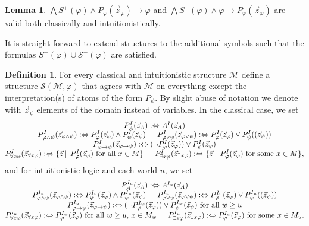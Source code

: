 \documentclass[a4paper,11pt]{report}
\theoremstyle{definition}
\theoremstyle{definition}
\theoremstyle{definition}
\newtheorem{lemma}[theorem]{Lemma}
\theoremstyle{definition}
\theoremstyle{definition}
\newtheorem{definition}[theorem]{Definition}
\theoremstyle{definition}
\theoremstyle{definition}
\begin{document}
	\begin{lemma}
		$\bigwedge S^+(\varphi)\wedge P_\varphi(\vec z_\varphi)\to\varphi$ and $\bigwedge S^-(\varphi)\wedge \varphi\to P_\varphi(\vec z_\varphi)$ are valid both classically and intuitionistically.
	\end{lemma}
	
	It is straight-forward to extend structures to the additional symbols such that the formulas $S^+(\varphi)\cup\mathcal S^-(\varphi)$ are satisfied.
	\begin{definition}
		For every classical and intuitionistic structure $\mathcal M$ define a structure $\mathcal S(\mathcal M,\varphi)$ that agrees with $\mathcal M$ on everything except the interpretation(s) of atoms of the form $P_\psi$. By slight abuse of notation we denote with $\vec z_\psi$ elements of the domain instead of variables. In the classical case, we set
		$$\begin{matrix}
			P_A^I(\vec z_A):\Leftrightarrow A^I(\vec z_A)\\
			P_{\varphi\wedge\psi}^I(\vec z_{\varphi\wedge\psi}) :\Leftrightarrow P_{\varphi}^I(\vec z_\varphi)\wedge P_{\psi}^I(\vec z_\psi)\indent P_{\varphi\vee\psi}^I(\vec z_{\varphi\vee\psi}) :\Leftrightarrow P_{\varphi}^I(\vec z_\varphi)\vee P_{\psi}^I((\vec z_\psi))\\P_{\varphi\to\psi}^I(\vec z_{\varphi\to\psi}) :\Leftrightarrow (\neg P_{\varphi}^I(\vec z_{\varphi}))\vee P_{\psi}^I(\vec z_{\psi})\\P_{\forall x\varphi}^I(\vec z_{\forall x\varphi}) :\Leftrightarrow \{\vec z\:|\:\:P_{\varphi}^I(\vec z_\varphi) \text{ for all $x\in M$}\}\indent P_{\exists x\varphi}^I(\vec z_{\exists x\varphi}) :\Leftrightarrow \{\vec z\:|\:\:P_{\varphi}^I(\vec z_\varphi) \text{ for some $x\in M$}\},
		\end{matrix}$$
		and for intuitionistic logic and each world $u$, we set
		$$\begin{matrix}
			P_A^{I_u}(\vec z_A):\Leftrightarrow A^{I_u}(\vec z_A)\\
			P_{\varphi\wedge\psi}^{I_u}(\vec z_{\varphi\wedge\psi}) :\Leftrightarrow P_{\varphi}^{I_u}(\vec z_\varphi)\wedge P_{\psi}^{I_u}(\vec z_\psi)\indent P_{\varphi\vee\psi}^{I_u}(\vec z_{\varphi\vee\psi}) :\Leftrightarrow P_{\varphi}^{I_u}(\vec z_\varphi)\vee P_{\psi}^{I_u}((\vec z_\psi))\\
			P_{\varphi\to\psi}^{I_u}(\vec z_{\varphi\to\psi}) :\Leftrightarrow(\neg P_{\varphi}^{I_w}(\vec z_{\varphi}))\vee P_{\psi}^{I_w}(\vec z_{\psi})\text{ for all $w\geq u$}\\
			P_{\forall x\varphi}^{I_u}(\vec z_{\forall x\varphi}) :\Leftrightarrow P_{\varphi}^{I_w}(\vec z_\varphi) \text{ for all $w\geq u$, $x\in M_w$}\indent P_{\exists x\varphi}^{I_u}(\vec z_{\exists x\varphi}) :\Leftrightarrow P_{\varphi}^{I_u}(\vec z_\varphi) \text{ for some $x\in M_u$}.
		\end{matrix}$$
	\end{definition}
\end{document}
